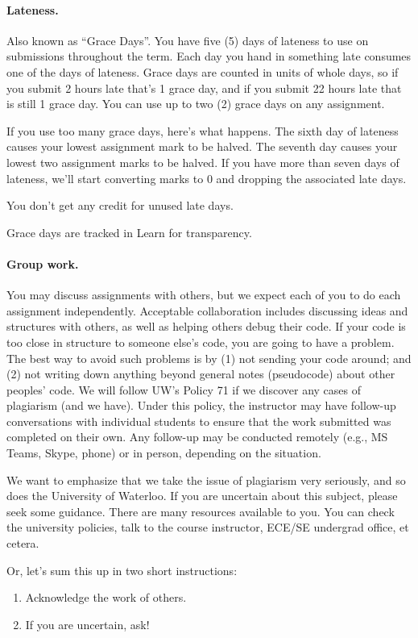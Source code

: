\documentclass[letterpaper,10pt]{article}
\begin{document}
\paragraph{Lateness.} Also known as ``Grace Days''. You have five (5) days of lateness to use on  submissions throughout the term. Each day you hand in something late consumes one of the days of lateness. Grace days are counted in units of whole days, so if you submit 2 hours late that's 1 grace day, and if you submit 22 hours late that is still 1 grace day. You can use up to two (2) grace days on any assignment. 

If you use too many grace days, here's what happens. The sixth day of lateness causes your lowest assignment mark to be halved. The seventh day causes your lowest two assignment marks to be halved. If you have more than seven days of lateness, we'll start converting marks to 0 and dropping the associated late days.

You don't get any credit for unused late days.

Grace days are tracked in Learn for transparency.

\paragraph{Group work.} 
You may discuss assignments with others, but we expect each of you to
do each assignment independently. Acceptable collaboration includes
discussing ideas and structures with others, as well as helping others
debug their code. If your code is too close in structure to someone
else's code, you are going to have a problem. The best way to avoid
such problems is by (1) not sending your code around; and (2) not
writing down anything beyond general notes (pseudocode) about other
peoples' code. We will follow UW's Policy 71 if we discover any cases of
plagiarism (and we have). Under this policy, the instructor may have follow-up conversations with individual students to ensure that the work submitted was completed on their own. Any follow-up may be conducted remotely (e.g., MS Teams, Skype, phone) or in person, depending on the situation.

We want to emphasize that we take the issue of plagiarism very seriously, and so does the University of Waterloo. If you are uncertain about this subject, please seek some guidance. There are many resources available to you. You can check the university policies, talk to the course instructor, ECE/SE undergrad office, et cetera.

Or, let's sum this up in two short instructions:
\begin{enumerate}
	\item Acknowledge the work of others. 
	\item If you are uncertain, ask!
\end{enumerate}
\end{document}
